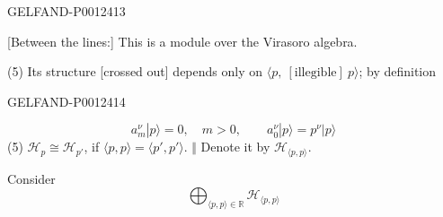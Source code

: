 \begin{GelfandAdjacentEvidence}{GELFAND-P001241}{3}


[Between the lines:] This is a module over the Virasoro algebra.

(5) Its structure [crossed out] depends only on $\langle p,\ [\text{illegible}]\ p\rangle$; by definition
\end{GelfandAdjacentEvidence}
\begin{GelfandAdjacentEvidence}{GELFAND-P001241}{4}

\end{GelfandAdjacentEvidence}


\begin{equation*}
a_m^\nu|p\rangle=0,\quad m>0,\qquad
 a_0^\nu|p\rangle=p^\nu|p\rangle\tag{6}
\end{equation*}
(5) $\mathcal H_p\cong\mathcal H_{p'}$, if $\langle p,p\rangle=\langle p',p'\rangle$.
$\Vert$ Denote it by $\mathcal H_{\langle p,p\rangle}$.

Consider
\begin{equation*}
\bigoplus_{\langle p,p\rangle\in\mathbb R}\mathcal H_{\langle p,p\rangle}\tag{7}
\end{equation*}


